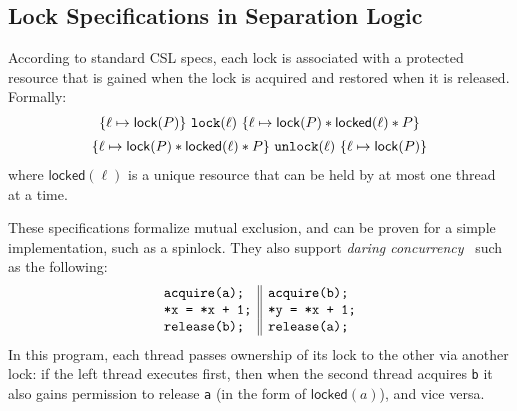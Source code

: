 \documentclass[acmsmall,screen,review,anonymous]{acmart}
\makeatletter
\newcommand*{\fforall}{%
	{\mathpalette\fforallAux{}}%
}
\newcommand*{\fforallAux}[1]{%
	\sbox\forallBox{$\m@th#1\forall$}%
	\setlength{\forallLineWidth}{.06\wd\forallBox}%
	\setlength{\forallSep}{.09\wd\forallBox}%
	\tikz[
	inner sep=0pt,
	line cap=round,
	line width=\forallLineWidth,
	]
	\draw
	(0,0) node (A) {\copy\forallBox}
	(A.south) ++(-\forallSep-\forallLineWidth,.4\forallLineWidth)
	coordinate (A1)
	(A.north west) ++(-\forallSep,-\forallLineWidth)
	coordinate (A2)
	(A1) -- (A2)
	;%
}
\newcommand{\ignore}[1]{}
\makeatother
\begin{document}
\subsection{Lock Specifications in Separation Logic}
According to standard CSL specs, each lock is associated with a protected
resource that is gained when the lock is acquired and restored when it is
released. Formally:
\[\begin{array}{c}
\{\ell \mapsto \mathsf{lock}(P)\}\ \texttt{lock}(\ell)\ \{\ell \mapsto \mathsf{lock}(P) \ast \mathsf{locked}(\ell) \ast P\}\vspace{.5em}\\
\{\ell \mapsto \mathsf{lock}(P) \ast \mathsf{locked}(\ell) \ast P\}\ \texttt{unlock}(\ell)\ \{\ell \mapsto \mathsf{lock}(P)\}
\end{array}\]
where $\mathsf{locked}(\ell)$ is a unique resource that can be held by at most one thread at a time.
\ignore{
In the atomic style, a lock is simply in one of two states, represented by e.g. a boolean that is $\mathsf{true}$ when the lock is held. Then acquire and release can be specified as:
\begin{mathpar}
\fforall b.\ \langle \ell \mapsto b \rangle\ \texttt{lock}(\ell)\ \langle \neg b \ast \ell \mapsto \mathsf{true} \rangle

\langle \ell \mapsto \mathsf{true} \rangle\ \texttt{unlock}(\ell)\ \langle \ell \mapsto \mathsf{false} \rangle
\end{mathpar}
While one thread is trying to acquire the lock, its state is unknown and may shift back and forth due to the behavior of other threads; at the lock's linearization point, we observe that the lock is not held ($\neg b$), and shift it to the held state ($\mathsf{true}$). By combining these specifications with a global invariant of the form $P \vee \ell \mapsto \mathsf{true}$, we can derive the invariant-style specs: an acquiring thread trades its ownership of the lock $\ell \mapsto \mathsf{true}$ for the invariant $P$, and then returns it before releasing the lock. (Less obviously, the TaDA-style specs can also be derived from invariant-style specs, using an invariant that is simply a ghost variable indicating the state $b$ of the lock%
.)}
These specifications formalize mutual exclusion, and can be proven for a simple
implementation, such as a spinlock. They also support \emph{daring
  concurrency}~\cite{csl} such as the following:
\[\begin{array}{l || l}
\texttt{acquire(a);} & \texttt{acquire(b);}\\
\texttt{*x = *x + 1;} & \texttt{*y = *x + 1;}\\
\texttt{release(b);} & \texttt{release(a);}
\end{array}\]
In this program, each thread passes ownership of its lock to the other via another lock: if the left thread executes first, then when the second thread acquires \texttt{b} it also gains permission to release \texttt{a} (in the form of $\mathsf{locked}(a)$), and vice versa.
\end{document}
